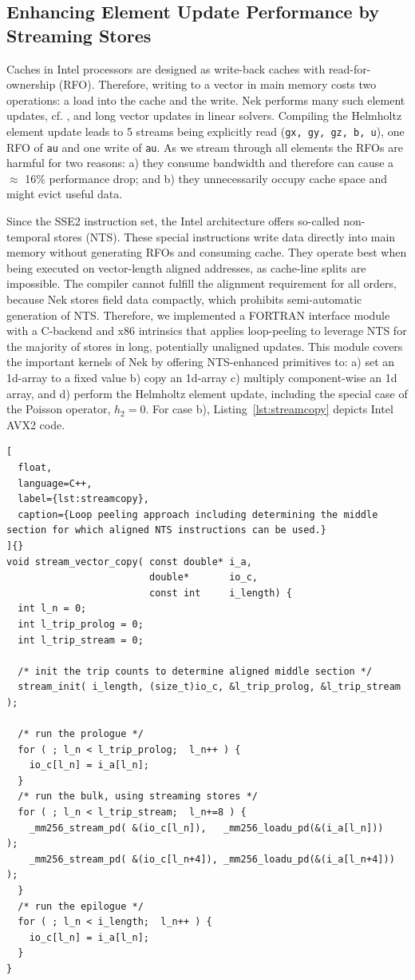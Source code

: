 \subsection{Enhancing Element Update Performance by Streaming Stores}
Caches in Intel processors are designed as write-back caches with read-for-ownership (RFO).
Therefore, writing to a vector in main memory costs two operations: a load into the cache and the write.
Nek performs many such element updates, cf. , and long vector updates in linear solvers.
Compiling the Helmholtz element update leads to 5 streams being
explicitly read (\texttt{gx, gy, gz, b, u}), one RFO of \texttt{au} and one write of \texttt{au}. As we stream through all elements
the RFOs are harmful for two reasons: a) they consume bandwidth
and therefore can cause a $\approx$ 16\% performance drop; 
and b) they unnecessarily occupy cache space and might  
evict useful data. 

Since the SSE2 instruction set, the Intel architecture offers so-called non-temporal stores (NTS).
These special instructions write data directly into main memory without generating RFOs and consuming cache.
They operate best when being executed on vector-length aligned addresses, as cache-line splits are impossible. 
The compiler cannot fulfill the alignment requirement for all orders, because Nek stores field data compactly, which prohibits semi-automatic generation of NTS.
Therefore, we implemented a FORTRAN interface module with a C-backend and x86 intrinsics that applies loop-peeling to leverage
NTS for the majority of stores in long, potentially unaligned updates. 
This module covers the important kernels of Nek by offering NTS-enhanced primitives to: a) set an 1d-array to a fixed value b) copy an 1d-array c) multiply component-wise an 1d array, and d) perform the Helmholtz element update, including the special case of the Poisson operator, $h_2 = 0$. For case b), Listing~\ref{lst:streamcopy} depicts Intel AVX2 code.

\begin{lstlisting}[
  float,
  language=C++,
  label={lst:streamcopy},
  caption={Loop peeling approach including determining the middle section for which aligned NTS instructions can be used.}
]{}
void stream_vector_copy( const double* i_a,
                         double*       io_c,
                         const int     i_length) {
  int l_n = 0;
  int l_trip_prolog = 0;
  int l_trip_stream = 0;
  
  /* init the trip counts to determine aligned middle section */
  stream_init( i_length, (size_t)io_c, &l_trip_prolog, &l_trip_stream );

  /* run the prologue */
  for ( ; l_n < l_trip_prolog;  l_n++ ) {
    io_c[l_n] = i_a[l_n];
  }
  /* run the bulk, using streaming stores */
  for ( ; l_n < l_trip_stream;  l_n+=8 ) {
    _mm256_stream_pd( &(io_c[l_n]),   _mm256_loadu_pd(&(i_a[l_n]))   );
    _mm256_stream_pd( &(io_c[l_n+4]), _mm256_loadu_pd(&(i_a[l_n+4])) );
  }
  /* run the epilogue */
  for ( ; l_n < i_length;  l_n++ ) {
    io_c[l_n] = i_a[l_n];
  }
}
\end{lstlisting}

